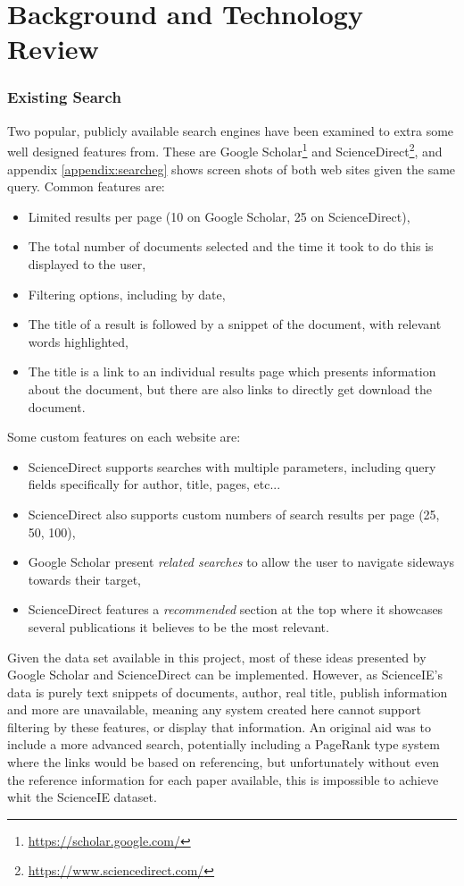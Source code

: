 \section{Background and Technology Review}
\subsubsection*{Existing Search}
Two popular, publicly available search engines have been examined to extra some well designed features from. These are Google Scholar\footnote{\href{https://scholar.google.com/}{https://scholar.google.com/}} and ScienceDirect\footnote{\href{https://www.sciencedirect.com/}{https://www.sciencedirect.com/}}, and appendix \ref{appendix:searcheg} shows screen shots of both web sites given the same query. Common features are:
\begin{itemize}
	\item Limited results per page (10 on Google Scholar, 25 on ScienceDirect),
	\item The total number of documents selected and the time it took to do this is displayed to the user,
	\item Filtering options, including by date,
	\item The title of a result is followed by a snippet of the document, with relevant words highlighted,
	\item The title is a link to an individual results page which presents information about the document, but there are also links to directly get download the document.
\end{itemize}

\noindent Some custom features on each website are:
\begin{itemize}
	\item ScienceDirect supports searches with multiple parameters, including query fields specifically for author, title, pages, etc...
	\item ScienceDirect also supports custom numbers of search results per page (25, 50, 100),
	\item Google Scholar present \textit{related searches} to allow the user to navigate sideways towards their target,
	\item ScienceDirect features a \textit{recommended} section at the top where it showcases several publications it believes to be the most relevant.
\end{itemize}

Given the data set available in this project, most of these ideas presented by Google Scholar and ScienceDirect can be implemented. However, as ScienceIE's data is purely text snippets of documents, author, real title, publish information and more are unavailable, meaning any system created here cannot support filtering by these features, or display that information. An original aid was to include a more advanced search, potentially including a PageRank type system \cite{Page1998} where the links would be based on referencing, but unfortunately without even the reference information for each paper available, this is impossible to achieve whit the ScienceIE dataset.

